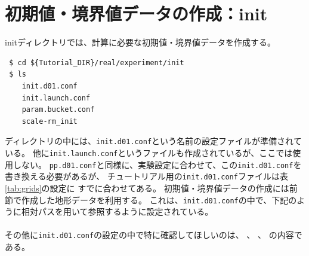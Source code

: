 \section{初期値・境界値データの作成：init} \label{sec:tutrial_real_init}

initディレクトリでは、\scalerm 計算に必要な初期値・境界値データを作成する。
\begin{verbatim}
 $ cd ${Tutorial_DIR}/real/experiment/init
 $ ls
    init.d01.conf
    init.launch.conf
    param.bucket.conf
    scale-rm_init
\end{verbatim}
ディレクトリの中には、\verb|init.d01.conf|という名前の設定ファイルが準備されている。
他に\verb|init.launch.conf|というファイルも作成されているが、ここでは使用しない。
\verb|pp.d01.conf|と同様に、実験設定に合わせて、この\verb|init.d01.conf|を書き換える必要があるが、
チュートリアル用の\verb|init.d01.conf|ファイルは表\ref{tab:grids}の設定に
すでに合わせてある。
初期値・境界値データの作成には前節で作成した地形データを利用する。
これは、\verb|init.d01.conf|の中で、下記のように相対パスを用いて参照するように設定されている。\\

\\

\noindent その他に\verb|init.d01.conf|の設定の中で特に確認してほしいのは、
、
、
の内容である。\\

